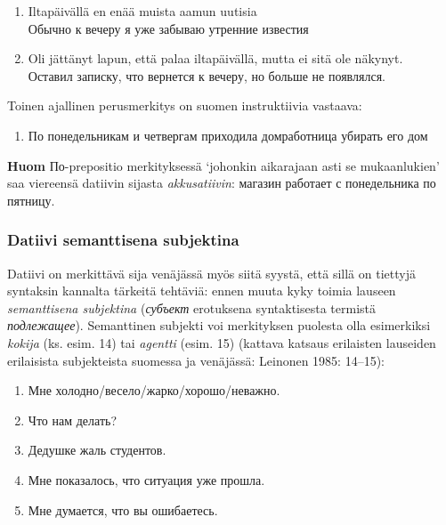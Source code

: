 \documentclass[]{scrartcl}
\providecommand{\tightlist}{%
  \setlength{\itemsep}{0pt}\setlength{\parskip}{0pt}}
\begin{document}
\begin{enumerate}
\def\labelenumi{(\arabic{enumi})}
\setcounter{enumi}{10}
\tightlist
\item
  Iltapäivällä en enää muista aamun uutisia\\
   Обычно к вечеру я уже забываю утренние известия
\item
  Oli jättänyt lapun, että palaa iltapäivällä, mutta ei sitä ole
  näkynyt.\\
   Оставил записку, что вернется к вечеру, но больше не появлялся.
\end{enumerate}

Toinen ajallinen perusmerkitys on suomen instruktiivia vastaava:

\begin{enumerate}
\def\labelenumi{(\arabic{enumi})}
\setcounter{enumi}{12}
\tightlist
\item
  По понедельникам и четвергам приходила домработница убирать его дом
\end{enumerate}

\textbf{Huom} По-prepositio merkityksessä `johonkin aikarajaan asti se
mukaanlukien' saa viereensä datiivin sijasta \emph{akkusatiivin}:
магазин работает с понедельника по пятницу.

\subsubsection{Datiivi semanttisena
subjektina}\label{datiivi-semanttisena-subjektina}

Datiivi on merkittävä sija venäjässä myös siitä syystä, että sillä on
tiettyjä syntaksin kannalta tärkeitä tehtäviä: ennen muuta kyky toimia
lauseen \emph{semanttisena subjektina} (\emph{субъект} erotuksena
syntaktisesta termistä \emph{подлежащее}). Semanttinen subjekti voi
merkityksen puolesta olla esimerkiksi \emph{kokija} (ks. esim. 14) tai
\emph{agentti} (esim. 15) (kattava katsaus erilaisten lauseiden
erilaisista subjekteista suomessa ja venäjässä: Leinonen 1985: 14--15):

\begin{enumerate}
\def\labelenumi{(\arabic{enumi})}
\setcounter{enumi}{13}
\tightlist
\item
  Мне холодно/весело/жарко/хорошо/неважно.
\item
  Что нам делать?
\item
  Дедушке жаль студентов.
\item
  Мне показалось, что ситуация уже прошла.
\item
  Мне думается, что вы ошибаетесь.
\end{enumerate}
\end{document}
